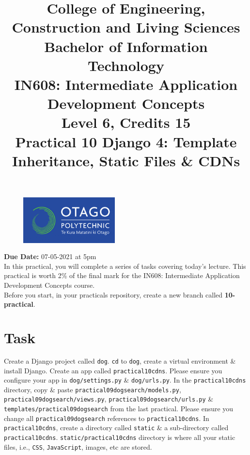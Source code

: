\documentclass{article}
\author{}
\begin{document}
\begin{figure}
	\centering
	\includegraphics[width=50mm]{./img/logo.png}
\end{figure}

\title{College of Engineering, Construction and Living Sciences\\Bachelor of Information Technology\\IN608: Intermediate Application Development Concepts\\Level 6, Credits 15\\\textbf{Practical 10 Django 4: Template Inheritance, Static Files \& CDNs}} 
\date{}
\maketitle

\textbf{Due Date:} 07-05-2021 at 5pm \\ 

In this practical, you will complete a series of tasks covering today's lecture. This practical is worth 2\% of the final mark for the IN608: Intermediate Application Development Concepts course. \\

Before you start, in your practicals repository, create a new branch called \textbf{10-practical}.

\section*{Task} 
Create a Django project called \texttt{dog}. \texttt{cd} to \texttt{dog}, create a virtual environment \& install Django. Create an app called \texttt{practical10cdns}. Please ensure you configure your app in \texttt{dog/settings.py} \& \texttt{dog/urls.py}. In the \texttt{practical10cdns} directory, copy \& paste \texttt{practical09dogsearch/models.py}, \texttt{practical09dogsearch/views.py}, \texttt{practical09dogsearch/urls.py} \& \texttt{templates/practical09dogsearch} from the last practical. Please ensure you change all \texttt{practical09dogsearch} references to \texttt{practical10cdns}. In \texttt{practical10cdns}, create a directory called \texttt{static} \& a sub-directory called  \texttt{practical10cdns}. \texttt{static/practical10cdns} directory is where all your static files, i.e., \texttt{CSS}, \texttt{JavaScript}, images, etc are stored. \\
\end{document}
